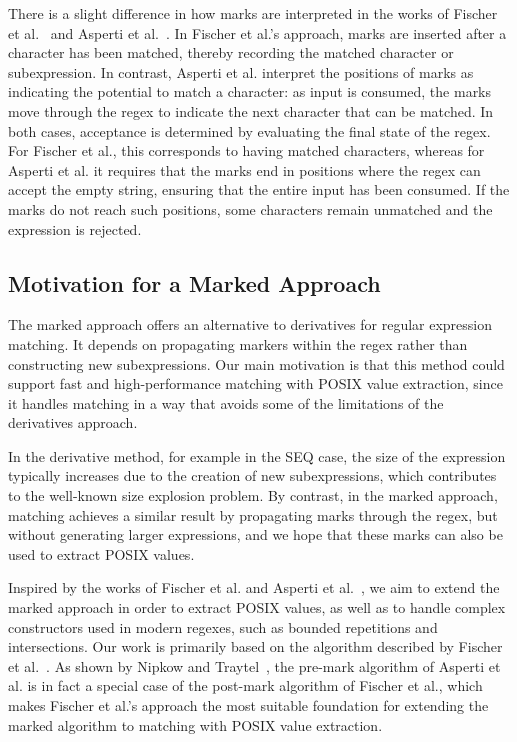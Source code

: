 \documentclass[12pt]{article}
\begin{document}
There is a slight difference in how marks are interpreted in the works of Fischer et al.~\cite{Fischer2010} 
and Asperti et al.~\cite{Asperti2010}. 
In Fischer et al.’s approach, marks are inserted after a character has been matched, thereby recording the matched character or subexpression. 
In contrast, Asperti et al. interpret the positions of marks as indicating the potential to match a character: as input is consumed, 
the marks move through the regex to indicate the next character that can be matched. 
In both cases, acceptance is determined by evaluating the final state of the regex. 
For Fischer et al., this corresponds to having matched characters, whereas for Asperti et al. it requires that the marks end in positions 
where the regex can accept the empty string, ensuring that the entire input has been consumed. 
If the marks do not reach such positions, some characters remain unmatched and the expression is rejected.

\subsection{Motivation for a Marked Approach}

The marked approach offers an alternative to derivatives for regular expression matching. 
It depends on propagating markers within the regex rather than constructing new subexpressions. 
Our main motivation is that this method could support fast and high-performance matching with POSIX value extraction, 
since it handles matching in a way that avoids some of the limitations of the derivatives approach.  

In the derivative method, for example in the SEQ case, the size of the expression typically increases due to the creation of new
subexpressions, which contributes to the well-known size explosion problem. 
By contrast, in the marked approach, matching achieves a similar result by propagating marks through the regex, 
but without generating larger expressions, and we hope that these marks can also be used to extract POSIX values.  

Inspired by the works of Fischer et al. and Asperti et al.~\cite{Fischer2010, Asperti2010}, 
we aim to extend the marked approach in order to extract POSIX values, as well as to handle complex constructors used in modern regexes, 
such as bounded repetitions and intersections. 
Our work is primarily based on the algorithm described by Fischer et al.~\cite{Fischer2010}. 
As shown by Nipkow and Traytel~\cite{NipkowTraytel2014}, the pre-mark algorithm of Asperti et al. is in fact a special case of the 
post-mark algorithm of Fischer et al., which makes Fischer et al.’s approach the most suitable foundation for extending the marked 
algorithm to matching with POSIX value extraction.
\end{document}
